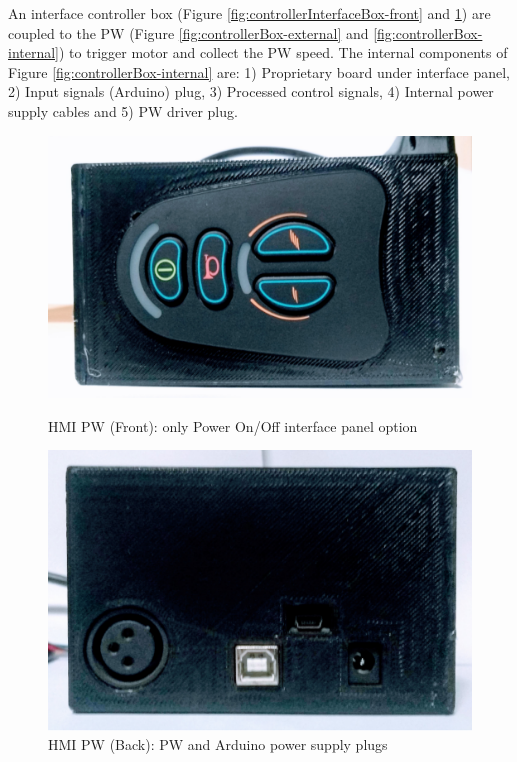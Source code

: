 An interface controller box (Figure \ref{fig:controllerInterfaceBox-front} and \ref{fig:controllerInterfaceBox-back}) are coupled to the PW (Figure \ref{fig:controllerBox-external} and \ref{fig:controllerBox-internal}) to trigger motor and collect the PW speed. The  internal components of Figure \ref{fig:controllerBox-internal} are: 1) Proprietary board under interface panel, 2) Input signals (Arduino) plug, 3) Processed control signals, 4) Internal power supply cables and 5) PW driver plug.


\begin{figure}[!htbp]
\center
\begin{minipage}{0.495\linewidth}
\center
\captionsetup{justification=centering,margin=0cm,font=small}
\includegraphics[width=0.85\linewidth]{img/cap4/controllerInterfaceBox-front}
\caption{HMI PW (Front): only Power On/Off interface panel option} \label{fig:controllerInterfaceBox-front}
\end{minipage}
\begin{minipage}{0.495\linewidth}
\center
\captionsetup{justification=centering,margin=0cm,font=small}
\includegraphics[width=0.8\linewidth]{img/cap4/controllerInterfaceBox-back}
\caption{HMI PW (Back): PW and Arduino power supply plugs} \label{fig:controllerInterfaceBox-back}
\end{minipage}
\end{figure}


